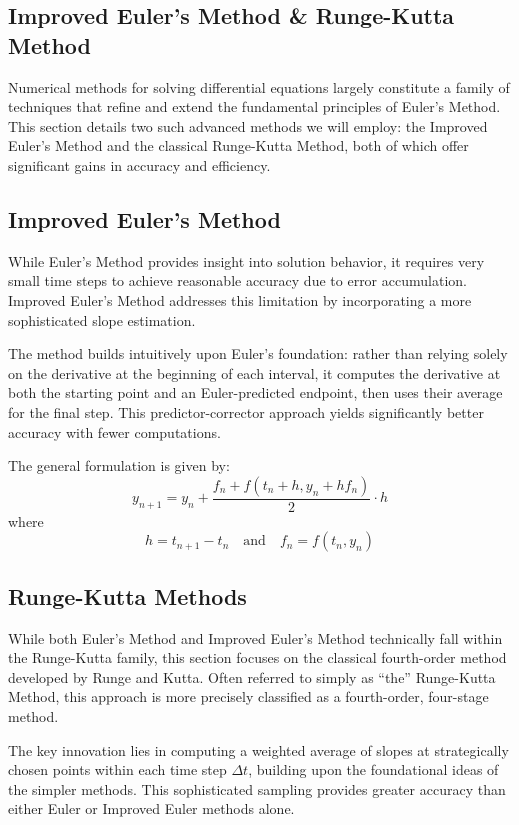 \documentclass{article} %
\begin{document}
\begin{multicols}{2}
\section{Improved Euler's Method \& Runge-Kutta Method}
\label{app:c_numerical_methods}
Numerical methods for solving differential equations largely constitute a family of techniques that refine and extend the fundamental principles of Euler's Method. 
This section details two such advanced methods we will employ: the Improved Euler's Method and the classical Runge-Kutta Method, both of which offer significant gains in accuracy and efficiency.

\subsection{Improved Euler's Method}
\label{app:c_improved_eulers}

While Euler's Method provides insight into solution behavior, it requires very small time steps to achieve reasonable accuracy due to error accumulation. 
Improved Euler's Method addresses this limitation by incorporating a more sophisticated slope estimation.

The method builds intuitively upon Euler's foundation: rather than relying solely on the derivative at the beginning of each interval, it computes the derivative at both the starting point and an Euler-predicted endpoint, then uses their average for the final step. 
This predictor-corrector approach yields significantly better accuracy with fewer computations.

The general formulation is given by:
\[
    y_{n+1} = y_{n} + \frac{f_{n} + f(t_{n} + h, y_{n} + hf_{n})}{2} \cdot h
\]
where 
\[
    h = t_{n+1} - t_{n} \quad \text{and} \quad f_{n} = f(t_{n}, y_{n})
\]

\subsection{Runge-Kutta Methods}
\label{app:c_runge_kutta}

While both Euler's Method and Improved Euler's Method technically fall within the Runge-Kutta family, this section focuses on the classical fourth-order method developed by Runge and Kutta. 
Often referred to simply as ``the'' Runge-Kutta Method, this approach is more precisely classified as a fourth-order, four-stage method.

The key innovation lies in computing a weighted average of slopes at strategically chosen points within each time step $\Delta t$, building upon the foundational ideas of the simpler methods. 
This sophisticated sampling provides greater accuracy than either Euler or Improved Euler methods alone.


\end{multicols}
\end{document}
